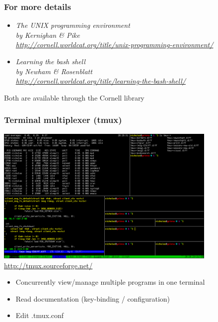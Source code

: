 \documentclass{beamer}
\begin{document}
\begin{frame}
  \frametitle{For more details}
  \begin{itemize}
  \item \it{The UNIX programming environment} \\
  by Kernighan \& Pike \\
  \url{http://cornell.worldcat.org/title/unix-programming-environment/} \\
  \item \it{Learning the bash shell} \\
  by Newham \& Rosenblatt \\
  \url{http://cornell.worldcat.org/title/learning-the-bash-shell/} \\
  \end{itemize}

  \vspace{5mm}  
  Both are available through the Cornell library
\end{frame}

\begin{frame}
  \frametitle{Terminal multiplexer (tmux)}

  \begin{center}
  \includegraphics[width=0.8\textwidth]{tmux} \\
  \url{http://tmux.sourceforge.net/}
  \end{center}
  \begin{itemize}
  \item Concurrently view/manage multiple programs in one terminal
  \item Read documentation (key-binding / configuration)
  \item Edit .tmux.conf
  \end{itemize}

\end{frame}
\end{document}
